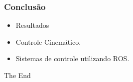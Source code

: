 \documentclass{beamer}
\begin{document}
\begin{frame}
\frametitle{Conclusão}
\begin{itemize}
\item Resultados 
\item Controle Cinemático.
\item Sistemas de controle utilizando ROS.
\end{itemize}
\end{frame}


\begin{frame}
\Huge{\centerline{The End}}
\end{frame}

\end{document}
